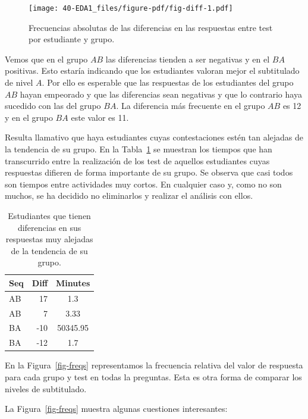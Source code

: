\documentclass[
  12pt,
  a4paper,
  extrafontsizes,
  onecolumn,
  openright]{memoir}
\begin{document}
\begin{figure}[h]

{\centering \texttt{[image: 40-EDA1\_files/figure-pdf/fig-diff-1.pdf]}

}

\caption{\label{fig-diff}Frecuencias absolutas de las diferencias en las
respuestas entre test por estudiante y grupo.}

\end{figure}

Vemos que en el grupo \(AB\) las diferencias tienden a ser negativas y
en el \(BA\) positivas. Esto estaría indicando que los estudiantes
valoran mejor el subtitulado de nivel \(A\). Por ello es esperable que
las respuestas de los estudiantes del grupo \(AB\) hayan empeorado y que
las diferencias sean negativas y que lo contrario haya sucedido con las
del grupo \(BA\). La diferencia más frecuente en el grupo \(AB\) es 12 y
en el grupo \(BA\) este valor es 11.

Resulta llamativo que haya estudiantes cuyas contestaciones estén tan
alejadas de la tendencia de su grupo. En la Tabla~\ref{tbl-diff} se
muestran los tiempos que han transcurrido entre la realización de los
test de aquellos estudiantes cuyas respuestas difieren de forma
importante de su grupo. Se observa que casi todos son tiempos entre
actividades muy cortos. En cualquier caso y, como no son muchos, se ha
decidido no eliminarlos y realizar el análisis con ellos.

\hypertarget{tbl-diff}{}
\begin{longtable}{lrc}
\caption{\label{tbl-diff}Estudiantes que tienen diferencias en sus respuestas muy alejadas de la
tendencia de su grupo. }\tabularnewline

\toprule
Seq & Diff & Minutes \\ 
\midrule
AB & 17 & 1.3 \\ 
AB & 7 & 3.33 \\ 
BA & -10 & 50345.95 \\ 
BA & -12 & 1.7 \\ 
\bottomrule
\end{longtable}

En la Figura~\ref{fig-freqs} representamos la frecuencia relativa del
valor de respuesta para cada grupo y test en todas la preguntas. Esta es
otra forma de comparar los niveles de subtitulado.

La Figura~\ref{fig-freqs} muestra algunas cuestiones interesantes:
\end{document}
